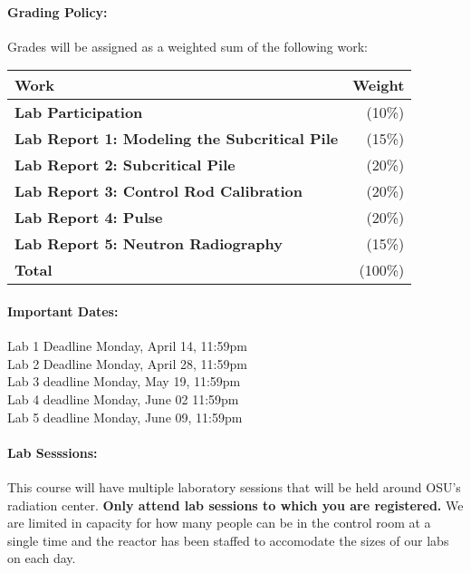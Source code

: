 \documentclass[11pt, a4paper]{article}
\begin{document}
\paragraph{Grading Policy:} Grades will be assigned as a weighted sum of the following work:

\begin{table}[h]
\begin{tabularx}{\textwidth}{Xr}
\textbf{Work} & \textbf{Weight}\\
\hline
\textbf{Lab Participation} & (10\%) \\
\textbf{Lab Report 1: Modeling the Subcritical Pile} & (15\%) \\
\textbf{Lab Report 2: Subcritical Pile} & (20\%) \\
\textbf{Lab Report 3: Control Rod Calibration} & (20\%) \\
\textbf{Lab Report 4: Pulse} & (20\%) \\
\textbf{Lab Report 5: Neutron Radiography} & (15\%) \\
\hline
\textbf{Total} & (100\%) \\
\end{tabularx}
\end{table}

\paragraph{Important Dates:}
\begin{center} \begin{minipage}{3.8in}
\begin{flushleft}
Lab 1 Deadline      \dotfill Monday, April 14, 11:59pm  \\
Lab 2 Deadline      \dotfill Monday, April 28, 11:59pm  \\
Lab 3 deadline      \dotfill Monday, May 19, 11:59pm  \\
Lab 4 deadline      \dotfill Monday, June 02 11:59pm  \\
Lab 5 deadline      \dotfill Monday, June 09, 11:59pm  \\
\end{flushleft}
\end{minipage}
\end{center}

\paragraph{Lab Sesssions:}

This course will have multiple laboratory sessions that will be held
around OSU's radiation center. \textbf{Only attend lab sessions to which you are registered.} We are limited in capacity for how many people can be in the control room at a single time and the reactor has been staffed to accomodate the sizes of our labs on each day. 
\end{document}
